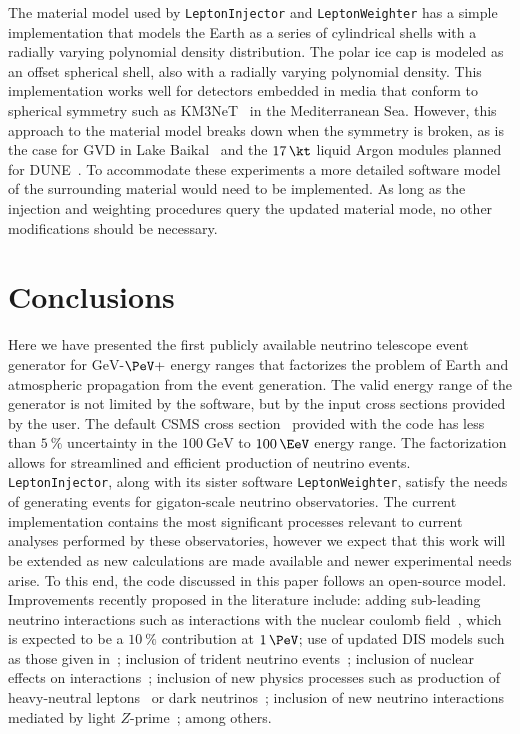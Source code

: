 \documentclass[main.tex]{subfiles}
\newcommand{\LeptonInjector}{\texttt{LeptonInjector}}
\newcommand{\LeptonWeighter}{\texttt{LeptonWeighter}}
\begin{document}
The material model used by \LeptonInjector{} and \LeptonWeighter{} has a simple implementation that models the Earth as a series of cylindrical shells with a radially varying polynomial density distribution.
The polar ice cap is modeled as an offset spherical shell, also with a radially varying polynomial density.
This implementation works well for detectors embedded in media that conform to spherical symmetry such as KM3NeT~\cite{Adrian-Martinez:2016fdl} in the Mediterranean Sea.
However, this approach to the material model breaks down when the symmetry is broken, as is the case for GVD in Lake Baikal~\cite{Avrorin:2018ijk} and the $\SI{17}\kt$ liquid Argon modules planned for DUNE~\cite{Abi:2020loh}.
To accommodate these experiments a more detailed software model of the surrounding material would need to be implemented.
As long as the injection and weighting procedures query the updated material mode, no other modifications should be necessary.

\section{Conclusions\label{sec:conclusions}}

Here we have presented the first publicly available neutrino telescope event generator for $\si\GeV$-$\si\PeV+$ energy ranges that factorizes the problem of Earth and atmospheric propagation from the event generation.
The valid energy range of the generator is not limited by the software, but by the input cross sections provided by the user. 
The default CSMS cross section~\cite{CooperSarkar:2011pa} provided with the code has less than $\SI{5}\percent$ uncertainty in the $\SI{100}\GeV$ to $\SI{100}\EeV$ energy range.
The factorization allows for streamlined and efficient production of neutrino events. 
\LeptonInjector{}, along with its sister software \LeptonWeighter{}, satisfy the needs of generating events for gigaton-scale neutrino observatories.
The current implementation contains the most significant processes relevant to current analyses performed by these observatories, however we expect that this work will be extended as new calculations are made available and newer experimental needs arise.
To this end, the code discussed in this paper follows an open-source model. 
Improvements recently proposed in the literature include: adding sub-leading neutrino interactions such as interactions with the nuclear coulomb field~\cite{Seckel:1997kk,Alikhanov:2014uja,Zhou:2019vxt,Beacom:2019pzs}, which is expected to be a $\SI{10}\percent$ contribution at $\SI{1}\PeV$; use of updated DIS models such as those given in~\cite{Garcia:2020jwr}; inclusion of trident neutrino events~\cite{Altmannshofer:2014pba,Ge:2017poy,Ballett:2018uuc,Altmannshofer:2019zhy,Beacom:2019pzs}; inclusion of nuclear effects on interactions~\cite{Bertone:2018dse}; inclusion of new physics processes such as production of heavy-neutral leptons~\cite{PhysRevLett.119.201804,Magill:2018jla,Cline:2020mdt} or dark neutrinos~\cite{Bertuzzo:2018itn,Blennow:2019fhy,Ballett:2019cqp,Coloma:2019qqj,Abdullahi:2020nyr}; inclusion of new neutrino interactions mediated by light $Z$-prime~\cite{Cherry:2016jol,Bakhti:2018avv,Ballett:2019xoj}; among others.
\end{document}
